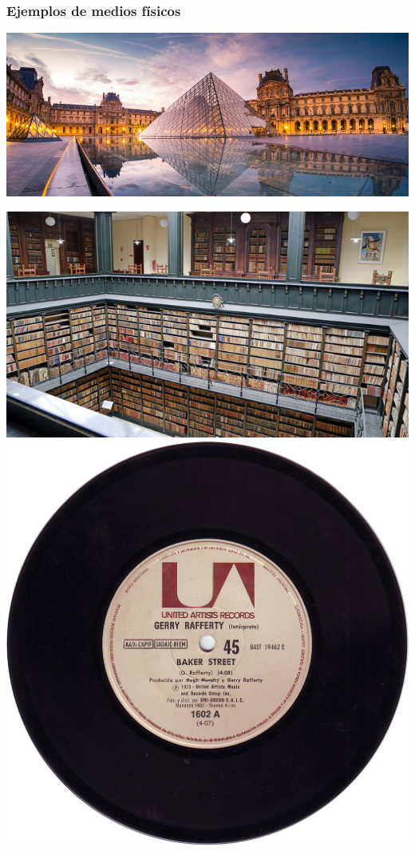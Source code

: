 \documentclass{beamer}
\begin{document}
\begin{frame}
    \frametitle{Ejemplos de medios físicos}
    \centering
    \includegraphics[scale=0.25]{louvre}    

    \includegraphics[scale=0.75]{biblioteca} \includegraphics[scale=0.2]{vinilo}    
\end{frame}
\end{document}
